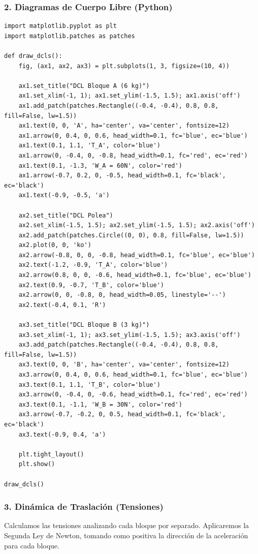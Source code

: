 \documentclass[12pt, a4paper]{article}
\begin{document}
\subsubsection*{2. Diagramas de Cuerpo Libre (Python)}
\begin{lstlisting}
import matplotlib.pyplot as plt
import matplotlib.patches as patches

def draw_dcls():
    fig, (ax1, ax2, ax3) = plt.subplots(1, 3, figsize=(10, 4))
    
    ax1.set_title("DCL Bloque A (6 kg)")
    ax1.set_xlim(-1, 1); ax1.set_ylim(-1.5, 1.5); ax1.axis('off')
    ax1.add_patch(patches.Rectangle((-0.4, -0.4), 0.8, 0.8, fill=False, lw=1.5))
    ax1.text(0, 0, 'A', ha='center', va='center', fontsize=12)
    ax1.arrow(0, 0.4, 0, 0.6, head_width=0.1, fc='blue', ec='blue')
    ax1.text(0.1, 1.1, 'T_A', color='blue')
    ax1.arrow(0, -0.4, 0, -0.8, head_width=0.1, fc='red', ec='red')
    ax1.text(0.1, -1.3, 'W_A = 60N', color='red')
    ax1.arrow(-0.7, 0.2, 0, -0.5, head_width=0.1, fc='black', ec='black')
    ax1.text(-0.9, -0.5, 'a')

    ax2.set_title("DCL Polea")
    ax2.set_xlim(-1.5, 1.5); ax2.set_ylim(-1.5, 1.5); ax2.axis('off')
    ax2.add_patch(patches.Circle((0, 0), 0.8, fill=False, lw=1.5))
    ax2.plot(0, 0, 'ko')
    ax2.arrow(-0.8, 0, 0, -0.8, head_width=0.1, fc='blue', ec='blue')
    ax2.text(-1.2, -0.9, 'T_A', color='blue')
    ax2.arrow(0.8, 0, 0, -0.6, head_width=0.1, fc='blue', ec='blue')
    ax2.text(0.9, -0.7, 'T_B', color='blue')
    ax2.arrow(0, 0, -0.8, 0, head_width=0.05, linestyle='--')
    ax2.text(-0.4, 0.1, 'R')

    ax3.set_title("DCL Bloque B (3 kg)")
    ax3.set_xlim(-1, 1); ax3.set_ylim(-1.5, 1.5); ax3.axis('off')
    ax3.add_patch(patches.Rectangle((-0.4, -0.4), 0.8, 0.8, fill=False, lw=1.5))
    ax3.text(0, 0, 'B', ha='center', va='center', fontsize=12)
    ax3.arrow(0, 0.4, 0, 0.6, head_width=0.1, fc='blue', ec='blue')
    ax3.text(0.1, 1.1, 'T_B', color='blue')
    ax3.arrow(0, -0.4, 0, -0.6, head_width=0.1, fc='red', ec='red')
    ax3.text(0.1, -1.1, 'W_B = 30N', color='red')
    ax3.arrow(-0.7, -0.2, 0, 0.5, head_width=0.1, fc='black', ec='black')
    ax3.text(-0.9, 0.4, 'a')

    plt.tight_layout()
    plt.show()

draw_dcls()
\end{lstlisting}

\subsubsection*{3. Dinámica de Traslación (Tensiones)}
Calculamos las tensiones analizando cada bloque por separado. Aplicaremos la Segunda Ley de Newton, tomando como positiva la dirección de la aceleración para cada bloque.
\end{document}
